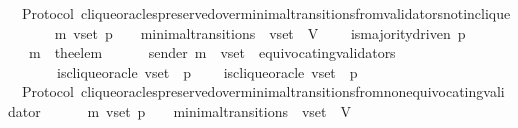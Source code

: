 \begin{isabellebody}
\isanewline
\isanewline
{}\isamarkupfalse%
\ {\isacharparenleft}\ Protocol{\isacharparenright}\ clique{\isacharunderscore}oracles{\isacharunderscore}preserved{\isacharunderscore}over{\isacharunderscore}minimal{\isacharunderscore}transitions{\isacharunderscore}from{\isacharunderscore}validators{\isacharunderscore}not{\isacharunderscore}in{\isacharunderscore}clique\ {\isacharcolon}\isanewline
\ \ {\isachardoublequoteopen}{\isasymforall}\ {\isasymsigma}\ {\isasymsigma}{\isacharprime}\ m{\isacharprime}\ v{\isacharunderscore}set\ p{\isachardot}\ {\isacharparenleft}{\isasymsigma}{\isacharcomma}\ {\isasymsigma}{\isacharprime}{\isacharparenright}\ {\isasymin}\ minimal{\isacharunderscore}transitions\ {\isasymand}\ v{\isacharunderscore}set\ {\isasymsubseteq}\ V\ \isanewline
\ \ {\isasymlongrightarrow}\ is{\isacharunderscore}majority{\isacharunderscore}driven\ p\isanewline
\ \ {\isasymlongrightarrow}\ m{\isacharprime}\ {\isacharequal}\ the{\isacharunderscore}elem\ {\isacharparenleft}{\isasymsigma}{\isacharprime}\ {\isacharminus}\ {\isasymsigma}{\isacharparenright}\isanewline
\ \ {\isasymlongrightarrow}\ sender\ m{\isacharprime}\ {\isasymnotin}\ v{\isacharunderscore}set\ {\isacharminus}\ equivocating{\isacharunderscore}validators\ {\isasymsigma}\isanewline
\ \ \ \ \ \ {\isasymand}\ is{\isacharunderscore}clique{\isacharunderscore}oracle\ {\isacharparenleft}v{\isacharunderscore}set{\isacharcomma}\ {\isasymsigma}{\isacharcomma}\ p{\isacharparenright}\ \isanewline
\ \ {\isasymlongrightarrow}\ is{\isacharunderscore}clique{\isacharunderscore}oracle\ {\isacharparenleft}v{\isacharunderscore}set{\isacharcomma}\ {\isasymsigma}{\isacharprime}{\isacharcomma}\ p{\isacharparenright}{\isachardoublequoteclose}\isanewline
%
\isadelimproof
\ \ %
\endisadelimproof
%
\isatagproof
{}\isamarkupfalse%
%
\endisatagproof
{\isafoldproof}%
%
\isadelimproof
\isanewline
%
\endisadelimproof
\isanewline
\isanewline
{}\isamarkupfalse%
\ {\isacharparenleft}\ Protocol{\isacharparenright}\ clique{\isacharunderscore}oracles{\isacharunderscore}preserved{\isacharunderscore}over{\isacharunderscore}minimal{\isacharunderscore}transitions{\isacharunderscore}from{\isacharunderscore}non{\isacharunderscore}equivocating{\isacharunderscore}validator\ {\isacharcolon}\isanewline
\ \ {\isachardoublequoteopen}{\isasymforall}\ {\isasymsigma}\ {\isasymsigma}{\isacharprime}\ m{\isacharprime}\ v{\isacharunderscore}set\ p{\isachardot}\ {\isacharparenleft}{\isasymsigma}{\isacharcomma}\ {\isasymsigma}{\isacharprime}{\isacharparenright}\ {\isasymin}\ minimal{\isacharunderscore}transitions\ {\isasymand}\ v{\isacharunderscore}set\ {\isasymsubseteq}\ V\ \isanewline

\end{isabellebody}
